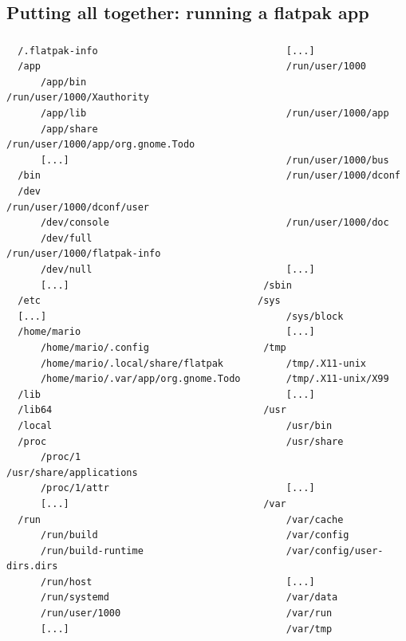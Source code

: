 \subsection{Putting all together: running a flatpak app}
\begin{frame}[fragile]
  \frametitle{\insertsubsection}

    \begin{tiny}
\begin{verbatim}
  /.flatpak-info                                 [...]
  /app                                           /run/user/1000
      /app/bin                                   /run/user/1000/Xauthority
      /app/lib                                   /run/user/1000/app
      /app/share                                 /run/user/1000/app/org.gnome.Todo
      [...]                                      /run/user/1000/bus
  /bin                                           /run/user/1000/dconf
  /dev                                           /run/user/1000/dconf/user
      /dev/console                               /run/user/1000/doc
      /dev/full                                  /run/user/1000/flatpak-info
      /dev/null                                  [...]
      [...]                                  /sbin
  /etc                                      /sys
  [...]                                          /sys/block
  /home/mario                                    [...]
      /home/mario/.config                    /tmp
      /home/mario/.local/share/flatpak           /tmp/.X11-unix
      /home/mario/.var/app/org.gnome.Todo        /tmp/.X11-unix/X99
  /lib                                           [...]
  /lib64                                     /usr
  /local                                         /usr/bin
  /proc                                          /usr/share
      /proc/1                                    /usr/share/applications
      /proc/1/attr                               [...]
      [...]                                  /var
  /run                                           /var/cache
      /run/build                                 /var/config
      /run/build-runtime                         /var/config/user-dirs.dirs
      /run/host                                  [...]
      /run/systemd                               /var/data
      /run/user/1000                             /var/run
      [...]                                      /var/tmp
\end{verbatim}
    \end{tiny}
\end{frame}

